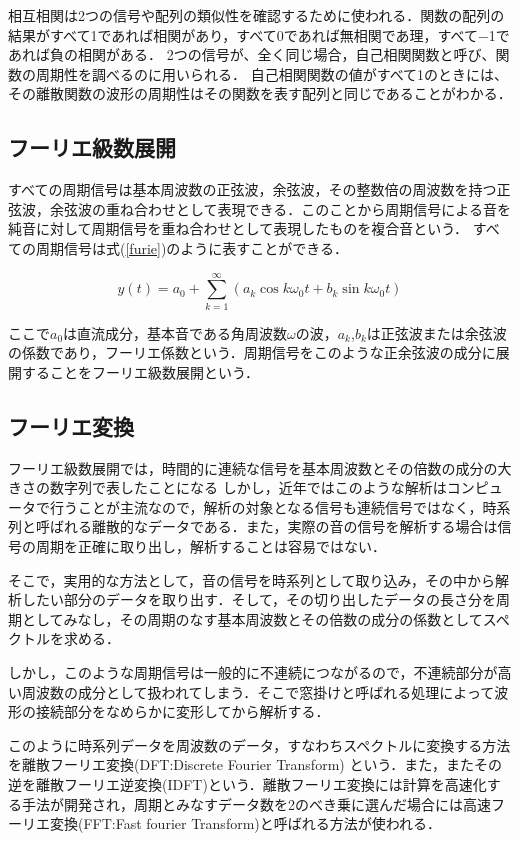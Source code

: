 \documentclass[a4j,11pt]{jsarticle}
\begin{document}
相互相関は2つの信号や配列の類似性を確認するために使われる．関数の配列の結果がすべて1であれば相関があり，すべて0であれば無相関であ理，すべて−1であれば負の相関がある．
2つの信号が、全く同じ場合，自己相関関数と呼び、関数の周期性を調べるのに用いられる． 自己相関関数の値がすべて1のときには、その離散関数の波形の周期性はその関数を表す配列と同じであることがわかる．
\subsection{フーリエ級数展開}
すべての周期信号は基本周波数の正弦波，余弦波，その整数倍の周波数を持つ正弦波，余弦波の重ね合わせとして表現できる．このことから周期信号による音を純音に対して周期信号を重ね合わせとして表現したものを複合音という．
すべての周期信号は式(\ref{furie})のように表すことができる．

{\Large
\begin{equation}
	\label{furie}
  y(t) = a_{0} + \sum^{\infty}_{k=1} (a_{k}\cos k\omega_{0}t +  b_{k}\sin k\omega_{0}t) 
\end{equation}
}

ここで$a_{0}$は直流成分，基本音である角周波数$\omega$の波，$a_{k}$,$b_{k}$は正弦波または余弦波の係数であり，フーリエ係数という．周期信号をこのような正余弦波の成分に展開することをフーリエ級数展開という．

\subsection{フーリエ変換}
フーリエ級数展開では，時間的に連続な信号を基本周波数とその倍数の成分の大きさの数字列で表したことになる
しかし，近年ではこのような解析はコンピュータで行うことが主流なので，解析の対象となる信号も連続信号ではなく，時系列と呼ばれる離散的なデータである．また，実際の音の信号を解析する場合は信号の周期を正確に取り出し，解析することは容易ではない．

そこで，実用的な方法として，音の信号を時系列として取り込み，その中から解析したい部分のデータを取り出す．そして，その切り出したデータの長さ分を周期としてみなし，その周期のなす基本周波数とその倍数の成分の係数としてスペクトルを求める．

しかし，このような周期信号は一般的に不連続につながるので，不連続部分が高い周波数の成分として扱われてしまう．そこで窓掛けと呼ばれる処理によって波形の接続部分をなめらかに変形してから解析する．

このように時系列データを周波数のデータ，すなわちスペクトルに変換する方法を離散フーリエ変換(DFT:Discrete Fourier Transform)
という．また，またその逆を離散フーリエ逆変換(IDFT)という．離散フーリエ変換には計算を高速化する手法が開発され，周期とみなすデータ数を2のべき乗に選んだ場合には高速フーリエ変換(FFT:Fast fourier Transform)と呼ばれる方法が使われる\cite{oka3}．
\end{document}

